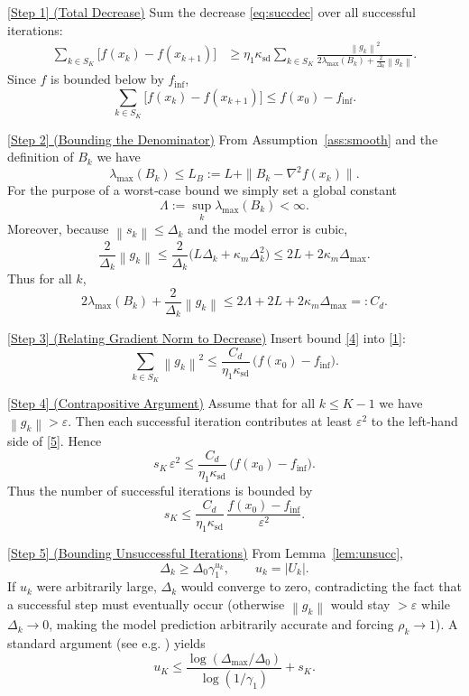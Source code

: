 \documentclass{article}
\newcommand{\norm}[1]{\left\lVert#1\right\rVert}
\begin{document}
\bigskip
\noindent\underline{[Step 1] (Total Decrease)}  
Sum the decrease \eqref{eq:succdec} over all successful iterations:
\begin{align}
\sum_{k\in S_{K}}\bigl[f(x_{k})-f(x_{k+1})\bigr]
&\ge
\eta_{1}\kappa_{\mathrm{sd}}
\sum_{k\in S_{K}}
\frac{\norm{g_{k}}^{2}}{2\lambda_{\max}(B_{k})+\frac{2}{\Delta_{k}}\norm{g_{k}}}.
\tag{1}
\end{align}
Since $f$ is bounded below by $f_{\inf}$,
\[
\sum_{k\in S_{K}}\bigl[f(x_{k})-f(x_{k+1})\bigr]\le f(x_{0})-f_{\inf}.
\tag{2}
\]

\bigskip
\noindent\underline{[Step 2] (Bounding the Denominator)}  
From Assumption~\ref{ass:smooth} and the definition of $B_{k}$ we have
\[
\lambda_{\max}(B_{k})\le L_{B}:=L+\|B_{k}-\nabla^{2}f(x_{k})\|.
\]
For the purpose of a worst‑case bound we simply set a global constant
\[
\Lambda:=\sup_{k}\lambda_{\max}(B_{k})<\infty.
\]
Moreover, because $\norm{s_{k}}\le\Delta_{k}$ and the model error is cubic,
\[
\frac{2}{\Delta_{k}}\norm{g_{k}}\le
\frac{2}{\Delta_{k}}\bigl(L\Delta_{k}+ \kappa_{m}\Delta_{k}^{2}\bigr)
\le 2L+2\kappa_{m}\Delta_{\max}.
\tag{3}
\]
Thus for all $k$,
\[
2\lambda_{\max}(B_{k})+\frac{2}{\Delta_{k}}\norm{g_{k}}
\le 2\Lambda+2L+2\kappa_{m}\Delta_{\max}
=:C_{d}.
\tag{4}
\]

\bigskip
\noindent\underline{[Step 3] (Relating Gradient Norm to Decrease)}  
Insert bound \eqref{4} into \eqref{1}:
\[
\sum_{k\in S_{K}}\norm{g_{k}}^{2}
\le
\frac{C_{d}}{\eta_{1}\kappa_{\mathrm{sd}}}\,\bigl(f(x_{0})-f_{\inf}\bigr).
\tag{5}
\]

\bigskip
\noindent\underline{[Step 4] (Contrapositive Argument)}  
Assume that for all $k\le K-1$ we have $\norm{g_{k}}>\varepsilon$. Then each successful iteration contributes at least $\varepsilon^{2}$ to the left‑hand side of \eqref{5}. Hence
\[
s_{K}\,\varepsilon^{2}\le
\frac{C_{d}}{\eta_{1}\kappa_{\mathrm{sd}}}\,\bigl(f(x_{0})-f_{\inf}\bigr).
\tag{6}
\]
Thus the number of successful iterations is bounded by
\[
s_{K}\le \frac{C_{d}}{\eta_{1}\kappa_{\mathrm{sd}}}\,
\frac{f(x_{0})-f_{\inf}}{\varepsilon^{2}}.
\tag{7}
\]

\bigskip
\noindent\underline{[Step 5] (Bounding Unsuccessful Iterations)}  
From Lemma~\ref{lem:unsucc},
\[
\Delta_{k}\ge\Delta_{0}\gamma_{1}^{u_{k}},
\qquad u_{k}=|U_{k}|.
\]
If $u_{k}$ were arbitrarily large, $\Delta_{k}$ would converge to zero, contradicting the fact that a successful step must eventually occur (otherwise $\norm{g_{k}}$ would stay $>\varepsilon$ while $\Delta_{k}\to0$, making the model prediction arbitrarily accurate and forcing $\rho_{k}\to1$). A standard argument (see e.g. \cite{Conn1999}) yields
\[
u_{K}\le \frac{\log(\Delta_{\max}/\Delta_{0})}{\log(1/\gamma_{1})}+s_{K}.
\tag{8}
\]
\end{document}
